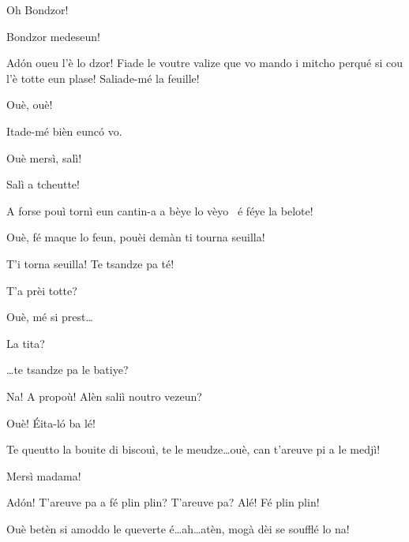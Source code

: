 \begin{drama}
\Gerominespeaks Oh Bondzor!

\Casimirspeaks Bondzor medeseun!

\MedMitchospeaks{} Ad\'on oueu l’è lo dzor! Fiade le voutre valize que vo mando i mitcho perqué si cou l’è totte eun plase! Saliade-mé la feuille!

\Gerominespeaks{} Ouè, ouè!


\MedMitchospeaks{} Itade-mé bièn eunc\'o vo.

\Casimirspeaks Ouè mersì, salì!

\MedMitchospeaks{} Salì  a tcheutte!


\Casimirspeaks A forse pouì tornì eun cantin-a a bèye lo vèyo \bicchiererosso\ é  féye la belote!

\Gerominespeaks Ouè, fé maque lo feun, pouèi demàn ti tourna seuilla!

\Casimirspeaks{} T'i torna seuilla!  Te tsandze pa té!


\Gerominespeaks T'a prèi totte?

\Casimirspeaks Ouè, mé si prest\ldots

\Gerominespeaks La tita?

\Casimirspeaks \ldots te tsandze pa le batiye?

\Gerominespeaks {} Na! A propoù! Alèn saliì noutro vezeun?

\Casimirspeaks Ouè! \'Eita-l\'o ba lé!


\Gerominespeaks{} Te queutto la bouite di biscouì, te le meudze\ldots ouè, can t'areuve pi a le medjì!


\Eunfeurmispeaks Mersì madama!

\Casimirspeaks{} Ad\'on! T'areuve pa a fé plin plin?  T'areuve pa? Alé! Fé plin plin!

\Gerominespeaks{} Ouè betèn si a\-mod\-do le queverte é\ldots ah\ldots atèn, mogà dèi se soufflé lo na!


\end{drama}
